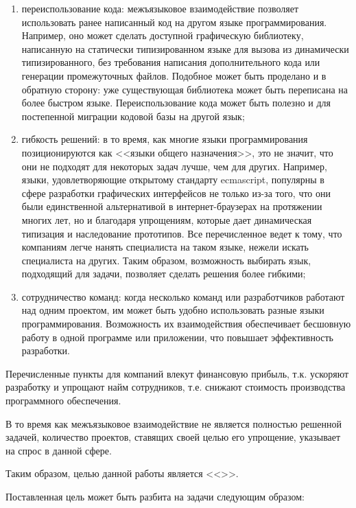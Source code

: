 \documentclass[times
,titlepage
]{itmo-student-thesis}
\begin{document}
\begin{enumerate}
\item переиспользование кода: межъязыковое взаимодействие позволяет использовать ранее написанный код на другом языке программирования. Например, оно может сделать доступной графическую библиотеку, написанную на статически типизированном языке для вызова из динамически типизированного, без требования написания дополнительного кода или генерации промежуточных файлов. Подобное может быть проделано и в обратную сторону: уже существующая библиотека может быть переписана на более быстром языке. Переиспользование кода может быть полезно и для постепенной миграции кодовой базы на другой язык;

\item гибкость решений: в то время, как многие языки программирования позиционируются как <<языки общего назначения>>, это не значит, что они не подходят для некоторых задач лучше, чем для других. Например, языки, удовлетворяющие открытому стандарту ecmascript, популярны в сфере разработки графических интерфейсов не только из-за того, что они были единственной альтернативой в интернет-браузерах на протяжении многих лет, но и благодаря упрощениям, которые дает динамическая типизация и наследование прототипов. Все перечисленное ведет к тому, что компаниям легче нанять специалиста на таком языке, нежели искать специалиста на других. Таким образом, возможность выбирать язык, подходящий для задачи, позволяет сделать решения более гибкими;

\item сотрудничество команд: когда несколько команд или разработчиков работают над одним проектом, им может быть удобно использовать разные языки программирования. Возможность их взаимодействия обеспечивает бесшовную работу в одной программе или приложении, что повышает эффективность разработки.
\end{enumerate}

Перечисленные пункты для компаний влекут финансовую прибыль, т.к. ускоряют разработку и упрощают найм сотрудников, т.е. снижают стоимость производства программного обеспечения.

В то время как межъязыковое взаимодействие не является полностью решенной задачей, количество проектов, ставящих своей целью его упрощение, указывает на спрос в данной сфере.

Таким образом, целью данной работы является <<\MyResearchAim>>.

Поставленная цель может быть разбита на задачи следующим образом:
\begin{enumerate}
	\MyResearchTargets
\end{enumerate}
\end{document}
